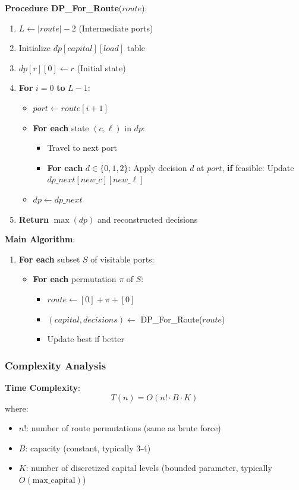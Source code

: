 \documentclass[12pt]{article}
\begin{document}
\textbf{Procedure DP\_For\_Route}($route$):
\begin{enumerate}
    \item $L \leftarrow |route| - 2$ (Intermediate ports)
    \item Initialize $dp[capital][load]$ table
    \item $dp[r][0] \leftarrow r$ (Initial state)
    \item \textbf{For} $i = 0$ \textbf{to} $L-1$:
    \begin{itemize}
        \item $port \leftarrow route[i+1]$
        \item \textbf{For each} state $(c, \ell)$ in $dp$:
        \begin{itemize}
            \item Travel to next port
            \item \textbf{For each} $d \in \{0, 1, 2\}$: Apply decision $d$ at $port$, \textbf{if} feasible: Update $dp\_next[new\_c][new\_\ell]$
        \end{itemize}
        \item $dp \leftarrow dp\_next$
    \end{itemize}
    \item \textbf{Return} $\max(dp)$ and reconstructed decisions
\end{enumerate}

\textbf{Main Algorithm}:
\begin{enumerate}
    \item \textbf{For each} subset $S$ of visitable ports:
    \begin{itemize}
        \item \textbf{For each} permutation $\pi$ of $S$:
        \begin{itemize}
            \item $route \leftarrow [0] + \pi + [0]$
            \item $(capital, decisions) \leftarrow$ DP\_For\_Route($route$)
            \item Update best if better
        \end{itemize}
    \end{itemize}
\end{enumerate}

\subsubsection{Complexity Analysis}

\textbf{Time Complexity}: 
\[
T(n) = O(n! \cdot B \cdot K)
\]
where:
\begin{itemize}
    \item $n!$: number of route permutations (same as brute force)
    \item $B$: capacity (constant, typically 3-4)
    \item $K$: number of discretized capital levels (bounded parameter, typically $O(\text{max\_capital})$)
\end{itemize}
\end{document}
